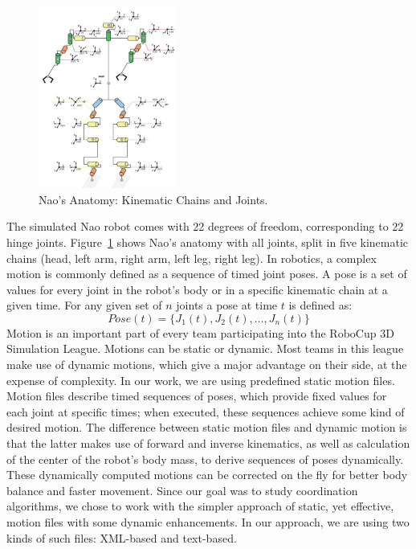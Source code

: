 \begin{figure}[t!]
\centering
  \includegraphics[width=0.4\textwidth]{Chapter3/figures/Models_NaoAnatomy.png}
  \caption{Nao's Anatomy: Kinematic Chains and Joints.}
  \label{fig:NaoAnatomy}
\end{figure}

The simulated Nao robot comes with 22 degrees of freedom, corresponding to 22 hinge joints. Figure~\ref{fig:NaoAnatomy} shows Nao's anatomy with all joints, split in five kinematic chains (head, left arm, right arm, left leg, right leg).
In robotics, a complex motion is commonly defined as a sequence of timed joint poses. A pose is a set of values for every joint in the robot's body or in a specific kinematic chain at a given time. 
For any given set of $n$ joints a pose at time $t$ is defined as:
\[
Pose(t)= \lbrace J_{1}(t), J_{2}(t), \ldots ,J_{n}(t) \rbrace
\]
Motion is an important part of every team participating into the RoboCup 3D Simulation League. Motions can be static or dynamic. Most teams in this league make use of dynamic motions, which give a major advantage on their side, at the expense of complexity. In our work, we are using predefined static motion files. Motion files describe timed sequences of poses, which provide fixed values for each joint at specific times; when executed, these sequences achieve some kind of desired motion. The difference between static motion files and dynamic motion is that the latter makes use of forward and inverse kinematics, as well as calculation of the center of the robot's body mass, to derive sequences of poses dynamically. These dynamically computed motions can be corrected on the fly for better body balance and faster movement. Since our goal was to study coordination algorithms, we chose to work with the simpler approach of static, yet effective, motion files with some dynamic enhancements. In our approach, we are using two kinds of such files: XML-based and text-based.


